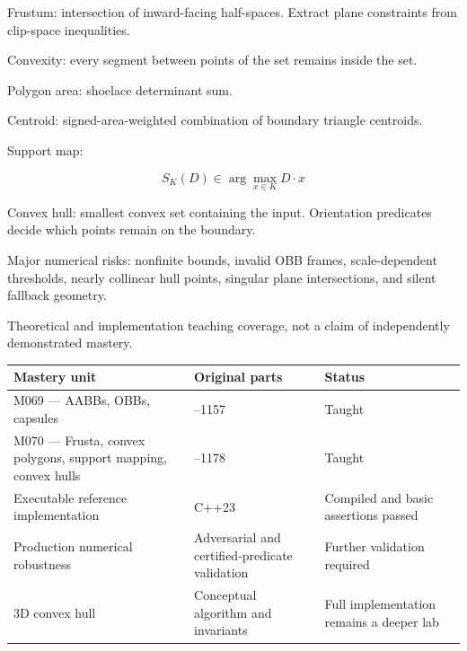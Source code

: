 Frustum: intersection of inward-facing half-spaces. Extract plane constraints from clip-space inequalities.

Convexity: every segment between points of the set remains inside the set.

Polygon area: shoelace determinant sum.

Centroid: signed-area-weighted combination of boundary triangle centroids.

Support map:

\[
\boxed{S_K(D)\in\arg\max_{x\in K}D\cdot x}
\]

Convex hull: smallest convex set containing the input. Orientation predicates decide which points remain on the boundary.

Major numerical risks: nonfinite bounds, invalid OBB frames, scale-dependent thresholds, nearly collinear hull points, singular plane intersections, and silent fallback geometry.

Theoretical and implementation teaching coverage, not a claim of independently demonstrated mastery.

{\def\LTcaptype{none} %
\begin{longtable}[]{@{}
  >{\raggedright\arraybackslash}p{}
  >{\raggedright\arraybackslash}p{}
  >{\raggedright\arraybackslash}p{}@{}}
\toprule\noalign{}
\begin{minipage}[b]{\linewidth}\raggedright
Mastery unit
\end{minipage} & \begin{minipage}[b]{\linewidth}\raggedright
Original parts
\end{minipage} & \begin{minipage}[b]{\linewidth}\raggedright
Status
\end{minipage} \\
\midrule\noalign{}
\endhead
\bottomrule\noalign{}
\endlastfoot
M069 --- AABBs, OBBs, capsules & 1133--1157 & Taught \\
M070 --- Frusta, convex polygons, support mapping, convex hulls & 1158--1178 & Taught \\
Executable reference implementation & C++23 & Compiled and basic assertions passed \\
Production numerical robustness & Adversarial and certified-predicate validation & Further validation required \\
3D convex hull & Conceptual algorithm and invariants & Full implementation remains a deeper lab \\
\end{longtable}
}

